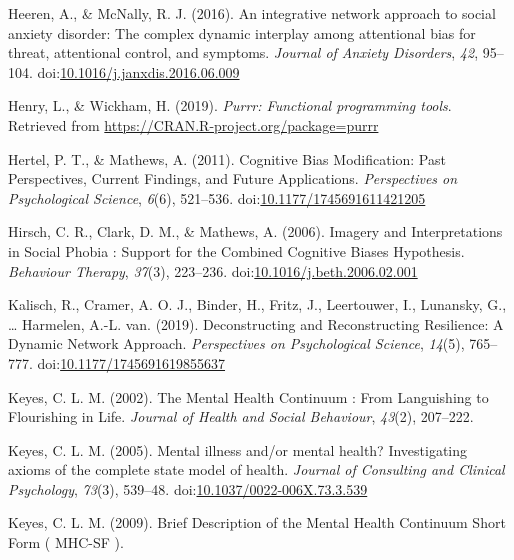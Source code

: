 \documentclass[man,floatsintext]{apa6}
\begin{document}
\leavevmode\hypertarget{ref-Heeren2016}{}%
Heeren, A., \& McNally, R. J. (2016). An integrative network approach to social anxiety disorder: The complex dynamic interplay among attentional bias for threat, attentional control, and symptoms. \emph{Journal of Anxiety Disorders}, \emph{42}, 95--104. doi:\href{https://doi.org/10.1016/j.janxdis.2016.06.009}{10.1016/j.janxdis.2016.06.009}

\leavevmode\hypertarget{ref-R-purrr}{}%
Henry, L., \& Wickham, H. (2019). \emph{Purrr: Functional programming tools}. Retrieved from \url{https://CRAN.R-project.org/package=purrr}

\leavevmode\hypertarget{ref-Hertel2011}{}%
Hertel, P. T., \& Mathews, A. (2011). Cognitive Bias Modification: Past Perspectives, Current Findings, and Future Applications. \emph{Perspectives on Psychological Science}, \emph{6}(6), 521--536. doi:\href{https://doi.org/10.1177/1745691611421205}{10.1177/1745691611421205}

\leavevmode\hypertarget{ref-Hirsch2006}{}%
Hirsch, C. R., Clark, D. M., \& Mathews, A. (2006). Imagery and Interpretations in Social Phobia : Support for the Combined Cognitive Biases Hypothesis. \emph{Behaviour Therapy}, \emph{37}(3), 223--236. doi:\href{https://doi.org/10.1016/j.beth.2006.02.001}{10.1016/j.beth.2006.02.001}

\leavevmode\hypertarget{ref-kalisch_deconstructing_2019}{}%
Kalisch, R., Cramer, A. O. J., Binder, H., Fritz, J., Leertouwer, I., Lunansky, G., \ldots{} Harmelen, A.-L. van. (2019). Deconstructing and Reconstructing Resilience: A Dynamic Network Approach. \emph{Perspectives on Psychological Science}, \emph{14}(5), 765--777. doi:\href{https://doi.org/10.1177/1745691619855637}{10.1177/1745691619855637}

\leavevmode\hypertarget{ref-Keyes2002}{}%
Keyes, C. L. M. (2002). The Mental Health Continuum : From Languishing to Flourishing in Life. \emph{Journal of Health and Social Behaviour}, \emph{43}(2), 207--222.

\leavevmode\hypertarget{ref-Keyes2005}{}%
Keyes, C. L. M. (2005). Mental illness and/or mental health? Investigating axioms of the complete state model of health. \emph{Journal of Consulting and Clinical Psychology}, \emph{73}(3), 539--48. doi:\href{https://doi.org/10.1037/0022-006X.73.3.539}{10.1037/0022-006X.73.3.539}

\leavevmode\hypertarget{ref-Keyes2009}{}%
Keyes, C. L. M. (2009). Brief Description of the Mental Health Continuum Short Form ( MHC-SF ).
\end{document}
